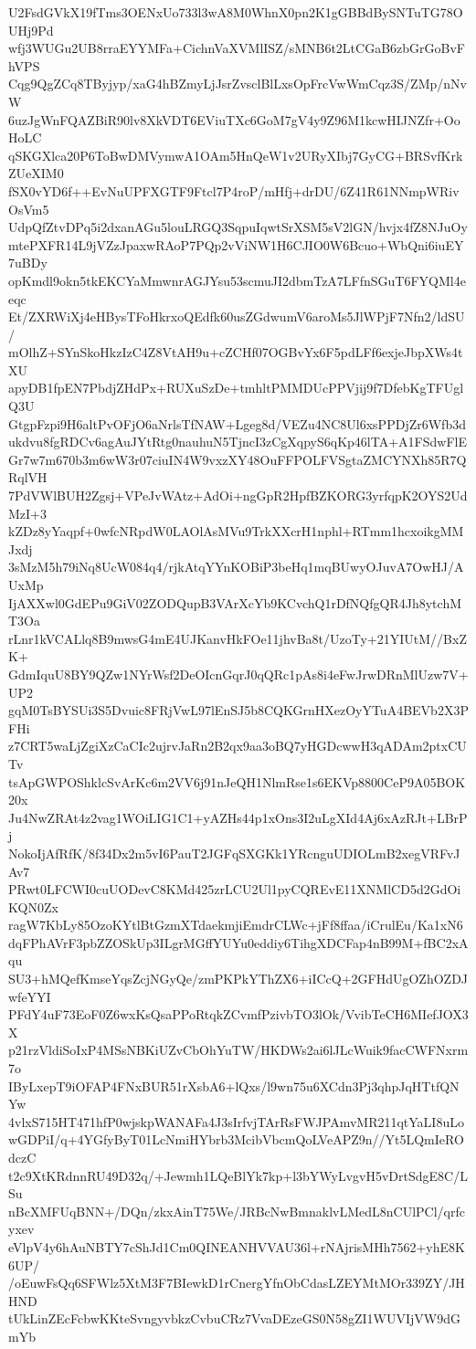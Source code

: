 U2FsdGVkX19fTms3OENxUo733l3wA8M0WhnX0pn2K1gGBBdBySNTuTG78OUHj9Pd
wfj3WUGu2UB8rraEYYMFa+CichnVaXVMlISZ/sMNB6t2LtCGaB6zbGrGoBvFhVPS
Cqg9QgZCq8TByjyp/xaG4hBZmyLjJsrZvsclBlLxsOpFrcVwWmCqz3S/ZMp/nNvW
6uzJgWnFQAZBiR90lv8XkVDT6EViuTXc6GoM7gV4y9Z96M1kcwHIJNZfr+OoHoLC
qSKGXlca20P6ToBwDMVymwA1OAm5HnQeW1v2URyXIbj7GyCG+BRSvfKrkZUeXIM0
fSX0vYD6f++EvNuUPFXGTF9Ftcl7P4roP/mHfj+drDU/6Z41R61NNmpWRivOsVm5
UdpQfZtvDPq5i2dxanAGu5louLRGQ3SqpuIqwtSrXSM5sV2lGN/hvjx4fZ8NJuOy
mtePXFR14L9jVZzJpaxwRAoP7PQp2vViNW1H6CJIO0W6Bcuo+WbQni6iuEY7uBDy
opKmdl9okn5tkEKCYaMmwnrAGJYsu53scmuJI2dbmTzA7LFfnSGuT6FYQMl4eeqc
Et/ZXRWiXj4eHBysTFoHkrxoQEdfk60usZGdwumV6aroMs5JlWPjF7Nfn2/ldSU/
mOlhZ+SYnSkoHkzIzC4Z8VtAH9u+cZCHf07OGBvYx6F5pdLFf6exjeJbpXWs4tXU
apyDB1fpEN7PbdjZHdPx+RUXuSzDe+tmhltPMMDUcPPVjij9f7DfebKgTFUglQ3U
GtgpFzpi9H6altPvOFjO6aNrlsTfNAW+Lgeg8d/VEZu4NC8Ul6xsPPDjZr6Wfb3d
ukdvu8fgRDCv6agAuJYtRtg0nauhuN5TjncI3zCgXqpyS6qKp46lTA+A1FSdwFlE
Gr7w7m670b3m6wW3r07ciuIN4W9vxzXY48OuFFPOLFVSgtaZMCYNXh85R7QRqlVH
7PdVWlBUH2Zgsj+VPeJvWAtz+AdOi+ngGpR2HpfBZKORG3yrfqpK2OYS2UdMzI+3
kZDz8yYaqpf+0wfcNRpdW0LAOlAsMVu9TrkXXcrH1nphl+RTmm1hcxoikgMMJxdj
3sMzM5h79iNq8UcW084q4/rjkAtqYYnKOBiP3beHq1mqBUwyOJuvA7OwHJ/AUxMp
IjAXXwl0GdEPu9GiV02ZODQupB3VArXcYb9KCvchQ1rDfNQfgQR4Jh8ytchMT3Oa
rLnr1kVCALlq8B9mwsG4mE4UJKanvHkFOe11jhvBa8t/UzoTy+21YIUtM//BxZK+
GdmIquU8BY9QZw1NYrWsf2DeOIcnGqrJ0qQRc1pAs8i4eFwJrwDRnMlUzw7V+UP2
gqM0TsBYSUi3S5Dvuic8FRjVwL97lEnSJ5b8CQKGrnHXezOyYTuA4BEVb2X3PFHi
z7CRT5waLjZgiXzCaCIc2ujrvJaRn2B2qx9aa3oBQ7yHGDcwwH3qADAm2ptxCUTv
tsApGWPOShklcSvArKc6m2VV6j91nJeQH1NlmRse1s6EKVp8800CeP9A05BOK20x
Ju4NwZRAt4z2vag1WOiLIG1C1+yAZHs44p1xOns3I2uLgXId4Aj6xAzRJt+LBrPj
NokoIjAfRfK/8f34Dx2m5vI6PauT2JGFqSXGKk1YRcnguUDIOLmB2xegVRFvJAv7
PRwt0LFCWI0cuUODevC8KMd425zrLCU2Ul1pyCQREvE11XNMlCD5d2GdOiKQN0Zx
ragW7KbLy85OzoKYtlBtGzmXTdaekmjiEmdrCLWc+jFf8ffaa/iCrulEu/Ka1xN6
dqFPhAVrF3pbZZOSkUp3ILgrMGffYUYu0eddiy6TihgXDCFap4nB99M+fBC2xAqu
SU3+hMQefKmseYqsZcjNGyQe/zmPKPkYThZX6+iICcQ+2GFHdUgOZhOZDJwfeYYI
PFdY4uF73EoF0Z6wxKsQsaPPoRtqkZCvmfPzivbTO3lOk/VvibTeCH6MIefJOX3X
p21rzVldiSoIxP4MSsNBKiUZvCbOhYuTW/HKDWs2ai6lJLcWuik9facCWFNxrm7o
IByLxepT9iOFAP4FNxBUR51rXsbA6+lQxs/l9wn75u6XCdn3Pj3qhpJqHTtfQNYw
4vlxS715HT471hfP0wjskpWANAFa4J3sIrfvjTArRsFWJPAmvMR211qtYaLI8uLo
wGDPiI/q+4YGfyByT01LcNmiHYbrb3McibVbcmQoLVeAPZ9n//Yt5LQmIeROdczC
t2c9XtKRdnnRU49D32q/+Jewmh1LQeBlYk7kp+l3bYWyLvgvH5vDrtSdgE8C/LSu
nBcXMFUqBNN+/DQn/zkxAinT75We/JRBcNwBmnaklvLMedL8nCUlPCl/qrfcyxev
eVlpV4y6hAuNBTY7cShJd1Cm0QINEANHVVAU36l+rNAjrisMHh7562+yhE8K6UP/
/oEuwFsQq6SFWlz5XtM3F7BIewkD1rCnergYfnObCdasLZEYMtMOr339ZY/JHHND
tUkLinZEcFcbwKKteSvngyvbkzCvbuCRz7VvaDEzeGS0N58gZI1WUVIjVW9dGmYb

